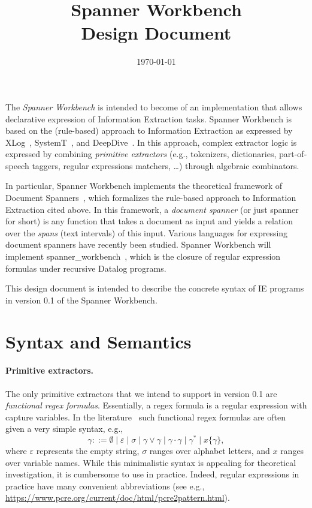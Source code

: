 \documentclass[a4paper,11pt,pdftex]{article}
\newcommand{\implname}{Spanner Workbench\xspace}
\newcommand{\ie}{IE\xspace}
\begin{document}
\title{\implname\\Design Document}
\date{\today}

\maketitle

The \emph{\implname} is intended to become of an implementation that allows
declarative expression of Information Extraction tasks. \implname is based on
the (rule-based) approach to Information Extraction as expressed by
XLog~\cite{SDNR07}, SystemT~\cite{CKLRRV10}, and DeepDive~\cite{DBLP:journals/cacm/ZhangRCSWW17}. In this approach, complex extractor logic is expressed by combining \emph{primitive extractors} (e.g., tokenizers, dictionaries, part-of-speech taggers, regular expressions matchers, \dots) through algebraic combinators.

In particular, \implname implements the theoretical framework of Document
Spanners~\cite{FaginKRV15}, which formalizes the rule-based approach to Information
Extraction cited above. In this framework, a \emph{document spanner} (or just
spanner for short) is any function that takes a document as input and yields a
relation over the \emph{spans} (text intervals) of this input.  Various
languages for expressing document spanners have recently been studied. \implname
will implement \textsf{spanner_workbench}~\cite{DBLP:conf/icdt/PeterfreundCFK19}, which is the closure of  regular expression formulas under recursive Datalog programs.

This design document is intended to describe the concrete syntax of \ie programs in version 0.1 of the \implname. 

\section{Syntax and Semantics}
\label{sec:syntax}

\paragraph*{Primitive extractors.} The only primitive extractors that we intend to support in version 0.1 are \emph{functional regex formulas}. Essentially, a regex formula is a regular expression with capture variables. In the literature~\cite{FaginKRV15} such functional regex formulas are often given a very simple syntax, e.g.,
\[ \gamma ::= \emptyset \mid \varepsilon \mid \sigma \mid \gamma \vee \gamma \mid \gamma \cdot \gamma \mid \gamma^* \mid x\{\gamma\},\]
where $\varepsilon$ represents the empty string, $\sigma$ ranges over alphabet letters, and $x$ ranges over variable names.
While this minimalistic syntax is appealing for theoretical investigation, it is
cumbersome to use in practice. Indeed, regular expressions in practice have many
convenient abbreviations (see e.g.,
\url{https://www.pcre.org/current/doc/html/pcre2pattern.html}).
\end{document}
